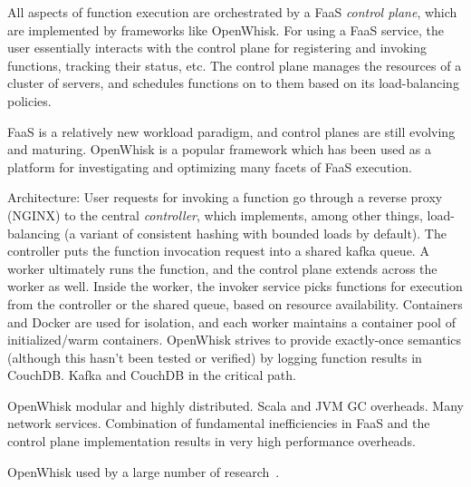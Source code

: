 All aspects of function execution are orchestrated by a FaaS \emph{control plane}, which are implemented by frameworks like OpenWhisk.
For using a FaaS service, the user essentially interacts with the control plane for registering and invoking functions, tracking their status, etc.
The control plane manages the resources of a cluster of servers, and schedules functions on to them based on its load-balancing policies.

FaaS is a relatively new workload paradigm, and control planes are still evolving and maturing.
OpenWhisk is a popular framework which has been used as a platform for investigating and optimizing many facets of FaaS execution.

Architecture: User requests for invoking a function go through a reverse proxy (NGINX) to the central \emph{controller}, which implements, among other things, load-balancing (a variant of consistent hashing with bounded loads by default).
The controller puts the function invocation request into a shared kafka queue. A worker ultimately runs the function, and the control plane extends across the worker as well.
Inside the worker, the invoker service picks functions for execution from the controller or the shared queue, based on resource availability.
Containers and Docker are used for isolation, and each worker maintains a container pool of initialized/warm containers.
OpenWhisk strives to provide exactly-once semantics (although this hasn't been tested or verified) by logging function results in CouchDB. Kafka and CouchDB in the critical path. 

OpenWhisk modular and highly distributed. Scala and JVM GC overheads. Many network services.
Combination of fundamental inefficiencies in FaaS and the control plane implementation results in very high performance overheads. 

OpenWhisk used by a large number of research~\cite{akkus_sand_2018, shahrad_serverless_2020, faascache-asplos21, faaslb-hpdc22, zhou2022aquatope, ensure-faas-acsos20}. 

